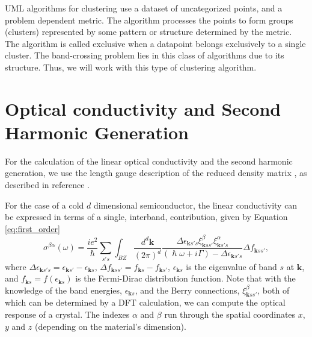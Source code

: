 \documentclass[a4paper,12pt]{report}
\begin{document}
UML algorithms for clustering use a dataset of uncategorized points, and a  problem dependent metric.
The algorithm processes the points to form groups (clusters) represented by some pattern or structure determined by the metric.
The algorithm is called exclusive when a datapoint belongs exclusively to a single cluster.
The band-crossing problem lies in this class of algorithms due to its structure.
Thus, we will work with this type of clustering algorithm.


\section{Optical conductivity and Second Harmonic Generation}

For the calculation of the linear optical conductivity and the second harmonic generation,
we use the length gauge description of the reduced density matrix \cite{Sipe1995,Sipe2000,Ventura2017},
as described in reference \cite{Ventura2017}.

For the case of a cold $d$ dimensional semiconductor, the linear conductivity can be expressed in terms of a single, interband, contribution,
 given by Equation \ref{eq:first_order}
\begin{equation}\label{eq:first_order}
 \sigma^{\beta\alpha}(\omega) = \frac{i e^2}{\hslash}\sum_{s's}\int_{BZ}\frac{d^d\pmb{k}}{(2\pi)^d}
 \frac{\Delta\epsilon_{\pmb{k}s's} \xi_{\pmb{k}ss'}^{\beta}\xi_{\pmb{k}s's}^{\alpha}}{(\hslash\omega + i\Gamma)
 - \Delta\epsilon_{\pmb{k}s's}}\Delta f_{\pmb{k}ss'},
\end{equation}
where $\Delta\epsilon_{\pmb{k}s's} = \epsilon_{\pmb{k}s'} - \epsilon_{\pmb{k}s}$,
 $\Delta f_{\pmb{k}ss'} = f_{\pmb{k}s} - f_{\pmb{k}s'}$,
 $\epsilon_{\pmb{k}s}$ is the eigenvalue of band $s$ at $\pmb{k}$, and $f_{\pmb{k}s}=f(\epsilon_{\pmb{k}s})$ is the
Fermi-Dirac distribution function.
Note that with the knowledge of the band energies, $\epsilon_{\pmb{k}s}$,
and the Berry connections, $\xi_{\pmb{k}ss'}^{\beta}$, both of which can be determined by a DFT calculation,
we can compute the optical response of a crystal.
The indexes $\alpha$ and $\beta$ run through the spatial coordinates $x$, $y$ and $z$ (depending on the material's dimension).
\end{document}
